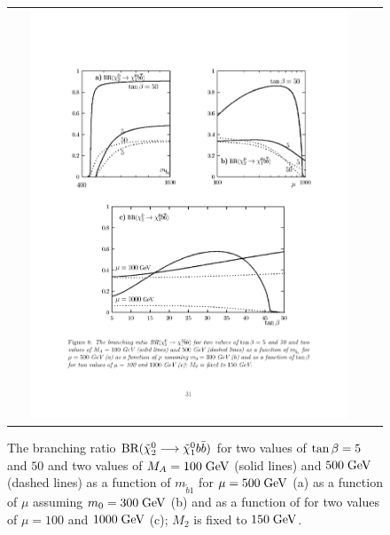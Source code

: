 \begin{figure}[tbh!]
	\centering
	\begin{tabular}{cc}
		\includegraphics[width=0.90\textwidth]{theory/pics/br_chibbarb.pdf}
	\end{tabular}
	\caption{The branching ratio $\text{BR}(\tilde{\chi}^{0}_{2} \longrightarrow \tilde{\chi}^{0}_{1} b \bar{b})$ for two values of $\tan\beta = 5$ and $50$ and two values of $M_{A} = 100\;\text{Ge}\kern-0.06667em\text{V}$ (solid lines) and $500\;\text{Ge}\kern-0.06667em\text{V}$ (dashed lines) as a function of $m_{\widetilde{b}1}$ for $\mu = 500\;\text{Ge}\kern-0.06667em\text{V} $ (a) as a function of $\mu$ assuming $m_{0} = 300\;\text{Ge}\kern-0.06667em\text{V}$ (b) and as a function of \tanbeta for two values of $\mu = 100$ and $1000\;\text{Ge}\kern-0.06667em\text{V}$ (c); $M_{2}$ is fixed to $150\;\text{Ge}\kern-0.06667em\text{V}$.}
	\label{fig:br_chibbarb}
	\end{figure}

\FloatBarrier

\clearpage
